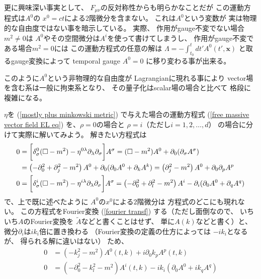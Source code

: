 更に興味深い事実として、
$F_{\mu \nu}$の反対称性からも明らかなことだが
この運動方程式は$A^0$の
$x^0 = ct$による$2$階微分を含まない。
これは$A^0$という変数が
実は物理的な自由度ではない事を暗示している。
実際、
作用がgauge不変でない場合$m^2 \neq 0$は
$A^0$やその空間微分は$A^i$を使って書けてしまうし、
作用がgauge不変である場合$m^2 = 0$には
この運動方程式の任意の解は
$\Lambda =
    - \int_{t_0}^t dt'
        A^0(t', \bm{x})$
と取るgauge変換によって
temporal gauge $A^0 = 0$
に移り変わる事が出来る。

このように$A^0$という非物理的な自由度が
Lagrangianに現れる事により
vector場を含む系は一般に拘束系となり、
その量子化はscalar場の場合と比べて
格段に複雑になる。

$\eta$を
(\ref{mostly plus minkowski metric})
で与えた場合の運動方程式
(\ref{free massive vector field EL eq})
を、$\rho = 0$の場合と
$\rho = i$（ただし$i = 1, 2, \dots, d$）
の場合に分けて実際に解いてみよう。
解きたい方程式は
\begin{subequations}
\begin{align}
    0
&=
    \bigg[
        \delta^0_\sigma
        (\Box - m^2)
    -
        \eta^{0 \lambda}
        \partial_\lambda
        \partial_\sigma
    \bigg]
    A^\sigma
=
    (\Box - m^2)
    A^0
+
    \partial_0
    (\partial_\sigma A^\sigma)
\notag\\&
=
    \left(
        - \partial_0^2
        + \partial_j^2
        - m^2
    \right)
    A^0
+
    \partial_0
    (\partial_0 A^0
    + \partial_k A^k)
=
    \left(
        \partial_j^2
        - m^2
    \right)
    A^0
+
    \partial_0
    \partial_p A^p
\\
    0
&=
    \bigg[
        \delta^i_\sigma
        (\Box - m^2)
    -
        \eta^{i \lambda}
        \partial_\lambda
        \partial_\sigma
    \bigg]
    A^\sigma
=
    \left(
        - \partial_0^2
        + \partial_l^2
        - m^2
    \right)
    A^i
-
    \partial_i
    (\partial_0 A^0
    + \partial_q A^q)
\end{align}
\end{subequations}
で、上で既に述べたように
$A^0$の$x^0$による$2$階微分は
方程式のどこにも現れない。
この方程式をFourier変換
(\ref{fourier transf})
する（ただし面倒なので、
いちいち$A$のFourier変換を
$\tilde{A}$などと書くことはせず、
単に$A(k)$などと書く）と、
微分$\partial_i$は$i k_i$倍に置き換わる
（Fourier変換の定義の仕方によっては
$- i k_i$となるが、
得られる解に違いはない）
ため、
\begin{subequations}
\begin{align}
    0
&=
    \left(
        - k_j^2
        - m^2
    \right)
    A^0 (t, k)
+
    i \partial_0
    k_p A^p (t, k)
\label{fourier transf of vector eom; time component}
\\
    0
&=
    \left(
        - \partial_0^2
        - k_l^2
        - m^2
    \right)
    A^i (t, k)
-
    i k_i
    (\partial_0 A^0
    + i k_q A^q)
\end{align}
\end{subequations}
